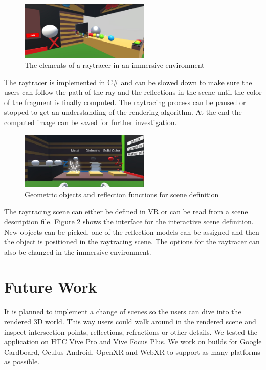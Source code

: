 \documentclass{VRARWorkshop}
\begin{document}
\begin{figure}[h!]
    \begin{center}
        \includegraphics[width=0.55\textwidth]{duringProcess}
        \caption{\label{vray:scene} The elements of a raytracer in an immersive environment}
    \end{center}
\end{figure}
The raytracer is implemented in C\# and can be slowed down to make sure the users can follow the path
of the ray and the reflections in the scene until the color of the fragment is finally computed.
The raytracing process can be paused or stopped to get an understanding of the rendering algorithm.
At the end the computed image can be saved for further investigation.

\begin{figure}[h!]
    \begin{center}
        \includegraphics[width=0.55\textwidth]{sphereCreating}
        \caption{\label{vray:materials} Geometric objects and reflection functions for scene definition}
    \end{center}
\end{figure}
The raytracing scene can either be defined in VR or can be read from a scene description file.
Figure \ref{vray:materials} shows the interface for the interactive scene definition.
New objects can be picked, one of the reflection models can be assigned and then the object
is positioned in the raytracing scene.
The options for the raytracer can also be changed in the immersive environment.
%
\section{Future Work}
It is planned to implement a change of scenes so the users can dive into the rendered 3D world.
This way users could walk around in the rendered scene and inspect  intersection points,
reflections, refractions or other details. 
We tested the application on HTC Vive Pro and Vive Focus Plus.
We work on builds for Google Cardboard, Oculus Android,
OpenXR and WebXR to support as many platforms as possible.
\end{document}
